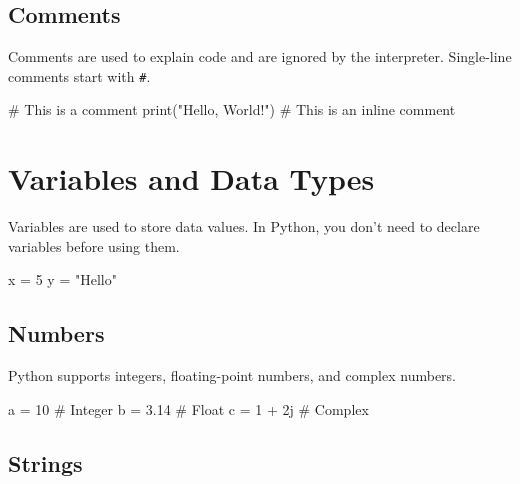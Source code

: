 \documentclass[
  letterpaper,
  DIV=11,
  numbers=noendperiod]{scrreprt}
\newenvironment{Shaded}{\begin{snugshade}}{\end{snugshade}}
\newcommand{\BuiltInTok}[1]{\textcolor[rgb]{0.00,0.23,0.31}{#1}}
\newcommand{\CommentTok}[1]{\textcolor[rgb]{0.37,0.37,0.37}{#1}}
\newcommand{\DecValTok}[1]{\textcolor[rgb]{0.68,0.00,0.00}{#1}}
\newcommand{\FloatTok}[1]{\textcolor[rgb]{0.68,0.00,0.00}{#1}}
\newcommand{\NormalTok}[1]{\textcolor[rgb]{0.00,0.23,0.31}{#1}}
\newcommand{\OperatorTok}[1]{\textcolor[rgb]{0.37,0.37,0.37}{#1}}
\newcommand{\OtherTok}[1]{\textcolor[rgb]{0.00,0.23,0.31}{#1}}
\newcommand{\StringTok}[1]{\textcolor[rgb]{0.13,0.47,0.30}{#1}}
\begin{document}
\subsection{Comments}\label{comments}

Comments are used to explain code and are ignored by the interpreter.
Single-line comments start with \texttt{\#}.

\begin{Shaded}
\begin{Highlighting}[]
\CommentTok{\# This is a comment}
\BuiltInTok{print}\NormalTok{(}\StringTok{"Hello, World!"}\NormalTok{)  }\CommentTok{\# This is an inline comment}
\end{Highlighting}
\end{Shaded}

\section{Variables and Data Types}\label{variables-and-data-types-1}

Variables are used to store data values. In Python, you don't need to
declare variables before using them.

\begin{Shaded}
\begin{Highlighting}[]
\NormalTok{x }\OperatorTok{=} \DecValTok{5}
\NormalTok{y }\OperatorTok{=} \StringTok{"Hello"}
\end{Highlighting}
\end{Shaded}

\subsection{Numbers}\label{numbers}

Python supports integers, floating-point numbers, and complex numbers.

\begin{Shaded}
\begin{Highlighting}[]
\NormalTok{a }\OperatorTok{=} \DecValTok{10}       \CommentTok{\# Integer}
\NormalTok{b }\OperatorTok{=} \FloatTok{3.14}     \CommentTok{\# Float}
\NormalTok{c }\OperatorTok{=} \DecValTok{1} \OperatorTok{+} \OtherTok{2j}   \CommentTok{\# Complex}
\end{Highlighting}
\end{Shaded}

\subsection{Strings}\label{strings}
\end{document}
